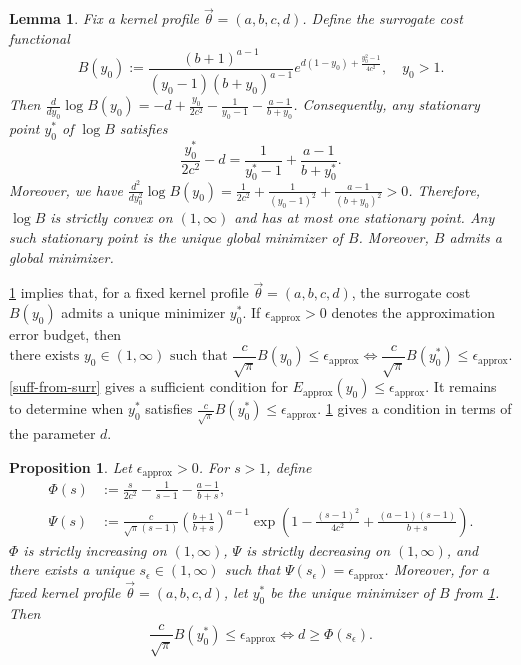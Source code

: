 \documentclass[10pt,reqno]{article}
\numberwithin{equation}{section}
\theoremstyle{plain}
\newtheorem{lem}[thm]{Lemma}
\newtheorem{prop}[thm]{Proposition}
\theoremstyle{definition}
\begin{document}
\begin{lem}\label{minimize-surrogate-approx}
Fix a kernel profile \(\vec{\theta} = (a,b,c,d)\). Define the surrogate cost functional
\begin{equation}
B(y_0) := \frac{(b+1)^{a-1}}{(y_0-1)(b+y_0)^{a-1}}e^{d(1-y_0)+\frac{y_0^2-1}{4c^2}}, \quad y_0 > 1.
\end{equation}
Then $\frac{d}{dy_0}\log B(y_0) = -d+\frac{y_0}{2c^2}-\frac{1}{y_0-1}-\frac{a-1}{b+y_0}$. 
Consequently, any stationary point \(y_0^*\) of \(\log B\) satisfies
\begin{equation}\label{surrogate-stat-eq}
\frac{y_0^*}{2c^2}-d = \frac{1}{y_0^*-1}+\frac{a-1}{b+y_0^*}.
\end{equation}
Moreover, we have $\frac{d^2}{dy_0^2}\log B(y_0) = \frac{1}{2c^2}+\frac{1}{(y_0-1)^2}+\frac{a-1}{(b+y_0)^2}>0$. 
Therefore, \(\log B\) is strictly convex on \((1,\infty)\) and has at most one stationary point. Any such stationary point is the unique global minimizer of \(B\). Moreover, \(B\) admits a global minimizer.
\end{lem}

\cref{minimize-surrogate-approx} implies that, for a fixed kernel profile \(\vec{\theta}=(a,b,c,d)\), the surrogate cost \(B(y_0)\) admits a unique minimizer \(y_0^\ast\). If \(\epsilon_{\operatorname{approx}}>0\) denotes the approximation error budget, then
\begin{equation}\label{suff-from-surr}
\text{there exists } y_0 \in (1,\infty) \text{ such that } \frac{c}{\sqrt{\pi}}B(y_0)\le \epsilon_{\operatorname{approx}} \iff \frac{c}{\sqrt{\pi}}B(y_0^\ast)\le \epsilon_{\operatorname{approx}}.
\end{equation}
\cref{suff-from-surr} gives a sufficient condition for \(E_{\operatorname{approx}}(y_0)\leq \epsilon_{\operatorname{approx}}\). It remains to determine when \(y_0^\ast\) satisfies \(\frac{c}{\sqrt{\pi}}B(y_0^\ast)\leq \epsilon_{\operatorname{approx}}\). \cref{feasible-kernel-approx} gives a condition in terms of the parameter \(d\).

\begin{prop}\label{feasible-kernel-approx}
Let \(\epsilon_{\operatorname{approx}} > 0\). For \(s > 1\), define
\begin{align}
\Phi(s) &:= \frac{s}{2c^2}-\frac{1}{s-1}-\frac{a-1}{b+s}, \\
\Psi(s) &:= \frac{c}{\sqrt{\pi}(s-1)}\left(\frac{b+1}{b+s}\right)^{a-1}\exp\left(1-\frac{(s-1)^2}{4c^2}+\frac{(a-1)(s-1)}{b+s}\right).
\end{align}
\(\Phi\) is strictly increasing on \((1,\infty)\), \(\Psi\) is strictly decreasing on \((1,\infty)\), and there exists a unique \(s_\epsilon\in(1,\infty)\) such that \(\Psi(s_\epsilon)=\epsilon_{\operatorname{approx}}\). Moreover, for a fixed kernel profile \(\vec{\theta}=(a,b,c,d)\), let \(y_0^\ast\) be the unique minimizer of \(B\) from \cref{minimize-surrogate-approx}. Then
\begin{equation}
\frac{c}{\sqrt{\pi}}B(y_0^\ast)\le \epsilon_{\operatorname{approx}} \iff d \ge \Phi(s_\epsilon).
\end{equation}
\end{prop}
\end{document}
